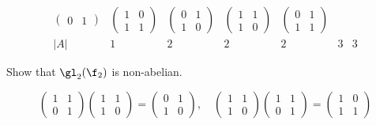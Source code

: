 \begin{problems}
\begin{sol}
$$\begin{array}{c|c|c|c|c|c|c}
\begin{pmatrix}
                0 & 1
            \end{pmatrix} &
            \begin{pmatrix}
                1 & 0 \\
                1 & 1
            \end{pmatrix} &
            \begin{pmatrix}
                0 & 1 \\
                1 & 0
            \end{pmatrix} &
            \begin{pmatrix}
                1 & 1 \\
                1 & 0
            \end{pmatrix} &
            \begin{pmatrix}
                0 & 1 \\
                1 & 1
            \end{pmatrix} \\
            \hline
            |A| & 1 & 2 & 2 & 2 & 3 & 3
        \end{array}$$
    \end{sol}
    \item Show that $\gl_2(\f_2)$ is non-abelian.
    \begin{sol}
        $$
        \begin{pmatrix}
            1 & 1 \\
            0 & 1
        \end{pmatrix}
        \begin{pmatrix}
            1 & 1 \\
            1 & 0
        \end{pmatrix} = 
        \begin{pmatrix}
            0 & 1 \\
            1 & 0
        \end{pmatrix}, \quad
        \begin{pmatrix}
            1 & 1 \\
            1 & 0
        \end{pmatrix}
        \begin{pmatrix}
            1 & 1 \\
            0 & 1
        \end{pmatrix} = 
        \begin{pmatrix}
            1 & 0 \\
            1 & 1
        \end{pmatrix}$$

\end{sol}
\end{problems}
